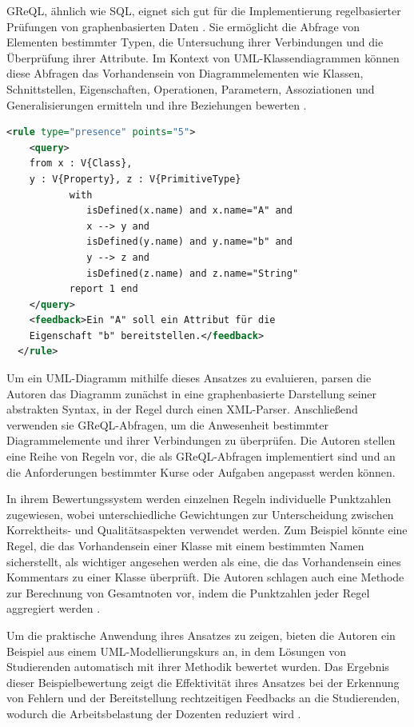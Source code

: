 \ac{GReQL}, ähnlich wie SQL, eignet sich gut für die Implementierung regelbasierter Prüfungen von graphenbasierten Daten \cite{striewe2014automated}. Sie ermöglicht die Abfrage von Elementen bestimmter Typen, die Untersuchung ihrer Verbindungen und die Überprüfung ihrer Attribute. Im Kontext von UML-Klassendiagrammen können diese Abfragen das Vorhandensein von Diagrammelementen wie Klassen, Schnittstellen, Eigenschaften, Operationen, Parametern, Assoziationen und Generalisierungen ermitteln und ihre Beziehungen bewerten \cite{striewe2011automated}.

\begin{lstlisting}[caption={[Codebeispiel] Codebeispiel in GReQL}, label={lst:greql}, float=!ht, language=xml]
  <rule type="presence" points="5">
    <query>
    from x : V{Class},
    y : V{Property}, z : V{PrimitiveType}
           with
              isDefined(x.name) and x.name="A" and
              x --> y and
              isDefined(y.name) and y.name="b" and
              y --> z and
              isDefined(z.name) and z.name="String"
           report 1 end
    </query>
    <feedback>Ein "A" soll ein Attribut für die
    Eigenschaft "b" bereitstellen.</feedback>
  </rule>
\end{lstlisting}

Um ein UML-Diagramm mithilfe dieses Ansatzes zu evaluieren, parsen die Autoren das Diagramm zunächst in eine graphenbasierte Darstellung seiner abstrakten Syntax, in der Regel durch einen XML-Parser. Anschließend verwenden sie \ac{GReQL}-Abfragen, um die Anwesenheit bestimmter Diagrammelemente und ihrer Verbindungen zu überprüfen. Die Autoren stellen eine Reihe von Regeln vor, die als \ac{GReQL}-Abfragen implementiert sind und an die Anforderungen bestimmter Kurse oder Aufgaben angepasst werden können.

In ihrem Bewertungssystem werden einzelnen Regeln individuelle Punktzahlen zugewiesen, wobei unterschiedliche Gewichtungen zur Unterscheidung zwischen Korrektheits- und Qualitätsaspekten verwendet werden. Zum Beispiel könnte eine Regel, die das Vorhandensein einer Klasse mit einem bestimmten Namen sicherstellt, als wichtiger angesehen werden als eine, die das Vorhandensein eines Kommentars zu einer Klasse überprüft. Die Autoren schlagen auch eine Methode zur Berechnung von Gesamtnoten vor, indem die Punktzahlen jeder Regel aggregiert werden \cite{striewe2011automated}.

Um die praktische Anwendung ihres Ansatzes zu zeigen, bieten die Autoren ein Beispiel aus einem UML-Modellierungskurs an, in dem Lösungen von Studierenden automatisch mit ihrer Methodik bewertet wurden. Das Ergebnis dieser Beispielbewertung zeigt die Effektivität ihres Ansatzes bei der Erkennung von Fehlern und der Bereitstellung rechtzeitigen Feedbacks an die Studierenden, wodurch die Arbeitsbelastung der Dozenten reduziert wird \cite{striewe2011automated}.

